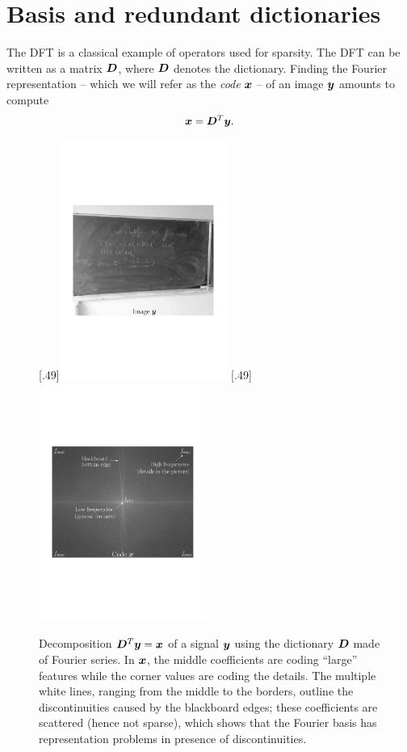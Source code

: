 \section{Basis and redundant dictionaries}

The \ac{DFT} is a classical example of operators used for sparsity. The \ac{DFT} can be written as a matrix $\bm{D}$, where $\bm{D}$ denotes the dictionary. Finding the Fourier representation – which we will refer as the \emph{code} $\bm{x}$ – of an image $\bm{y}$ amounts to compute 
$$\bm{x} = \bm{D}^T\bm{y}.$$

\begin{figure}[!ht]
%
  [.49\linewidth]{\includegraphics[width=0.49\textwidth]{figures/fourier/image.pdf}}
  [.49\linewidth]{\includegraphics[width=0.49\textwidth]{figures/fourier/fourier.pdf}}
  \caption{Decomposition $\bm{D}^T\bm{y}=\bm{x}$ of a signal $\bm{y}$ using the dictionary $\bm{D}$ made of Fourier series. In $\bm{x}$, the middle coefficients are coding “large” features while the corner values are coding the details. The multiple white lines, ranging from the middle to the borders, outline the discontinuities caused by the blackboard edges; these coefficients are scattered (hence not sparse), which shows that the Fourier basis has representation problems in presence of discontinuities.} \label{fig_fourier}
\end{figure}

